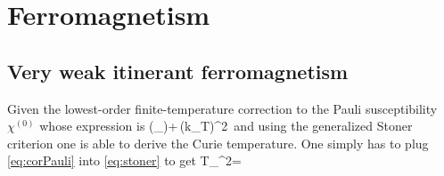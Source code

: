 \chapter{Ferromagnetism}

    \section{Very weak itinerant ferromagnetism}
       
        Given the lowest-order finite-temperature correction to the Pauli susceptibility $\chi^{(0)}$ whose expression is
        \be
            \simeq \rho(\varepsilon_)+\,\left(k_T\right)^2\, \label{eq:corPauli}
        \ee
        and using the generalized Stoner criterion one is able to derive the Curie temperature. One simply has to plug \eqref{eq:corPauli} into \eqref{eq:stoner} to get
        \be
            T_^2=\,
        \ee
   
